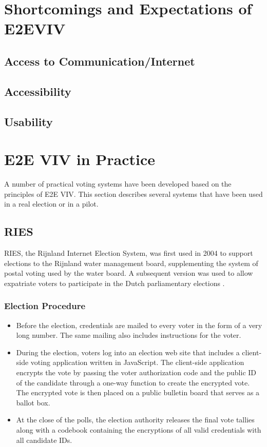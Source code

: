 \section{Shortcomings and Expectations of E2EVIV}
\subsection{Access to Communication/Internet}
\subsection{Accessibility}
\subsection{Usability}
\section{E2E VIV in Practice}

A number of practical voting systems have been developed based on the
principles of E2E VIV. This section describes several systems that
have been used in a real election or in a pilot.


\subsection{RIES~\cite{hubbers2004}}

RIES, the Rijnland Internet Election System, was first used in 2004 to
support elections to the Rijnland water management board,
supplementing the system of postal voting used by the water board. A
subsequent version was used to allow expatriate voters to participate
in the Dutch parliamentary elections \cite{gonggrijp2009}.

\subsubsection{Election Procedure}

\begin{itemize}

\item Before the election, credentials are mailed to every voter in
  the form of a very long number. The same mailing also includes
  instructions for the voter.

\item During the election, voters log into an election web site that
  includes a client-side voting application written in JavaScript. The
  client-side application encrypts the vote by passing the voter
  authorization code and the public ID of the candidate through a
  one-way function to create the encrypted vote.  The encrypted vote
  is then placed on a public bulletin board that serves as a ballot
  box.

\item At the close of the polls, the election authority releases the
  final vote tallies along with a codebook containing the encryptions
  of all valid credentials with all candidate IDs.

\end{itemize}

